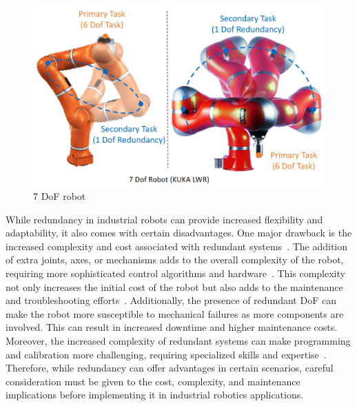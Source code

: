 \begin{figure}[H]
	\centerline{\includegraphics[scale=.14]{figures/red.png}}
	\caption{7 DoF robot~\cite{Hagane.2022}}
	\label{seven}
\end{figure}



While redundancy in industrial robots can provide increased flexibility and adaptability, it also comes with certain disadvantages. One major drawback is the increased complexity and cost associated with redundant systems~\cite{Halevi.2011}. The addition of extra joints, axes, or mechanisms adds to the overall complexity of the robot, requiring more sophisticated control algorithms and hardware~\cite{Duong.2021}. This complexity not only increases the initial cost of the robot but also adds to the maintenance and troubleshooting efforts~\cite{Ahangar.2019}. Additionally, the presence of redundant DoF can make the robot more susceptible to mechanical failures as more components are involved. This can result in increased downtime and higher maintenance costs. Moreover, the increased complexity of redundant systems can make programming and calibration more challenging, requiring specialized skills and expertise~\cite{Erdos.2016}. Therefore, while redundancy can offer advantages in certain scenarios, careful consideration must be given to the cost, complexity, and maintenance implications before implementing it in industrial robotics applications.




